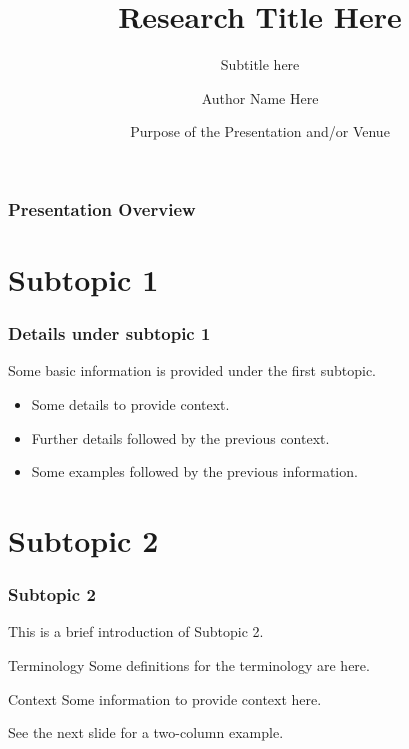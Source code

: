 \documentclass[hyperref={bookmarks=false},aspectratio=169, usenames,dvipsnames, hideothersubsections]{beamer}
\title[Research Title Here] %
{\bfseries{Research Title Here}}
\subtitle{Subtitle here} %
\author[Author Name] %
{Author Name Here\inst{1}}
\institute[IIIT-Delhi]  %
{
  \inst{1}
  Name of the department\\ %
  Indraprastha Institute of Information Technology
}
\date[Purpose, Month, Year] %
{Purpose of the Presentation and/or Venue} %
\begin{document}
\frame{\titlepage}  %

\begin{frame}
\frametitle{Presentation Overview}
\tableofcontents
\end{frame}


\section{Subtopic 1}

\begin{frame}
\frametitle{Details under subtopic 1}
Some basic information is provided under the first subtopic.

\begin{itemize} %
    \item<1-> Some details to provide context. 
    \item<2-> Further details followed by the previous context.
    \item<3-> Some examples followed by the previous information.
\end{itemize}

\end{frame}



%
%

\section{Subtopic 2}

\begin{frame}
\frametitle{Subtopic 2}

This is a brief introduction of \alert{Subtopic 2}. %

\begin{block}{Terminology}
Some definitions for the terminology are here.
\end{block}

\begin{alertblock}{Context}
Some information to provide context here.
\end{alertblock}

\begin{examples}
See the next slide for a two-column example.
\end{examples}
\end{frame}
\end{document}
